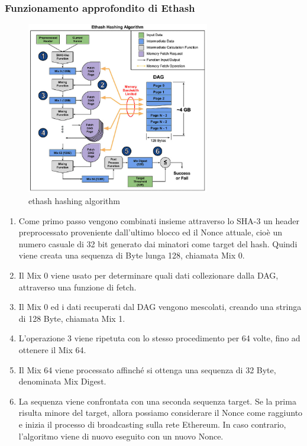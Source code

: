 \documentclass[a4paper,11pt]{report}
\begin{document}
\subsubsection{Funzionamento approfondito di Ethash}
\begin{figure}[htbp] 
\begin{center}
\includegraphics[width=8cm]{img/ethash.jpg}
\end{center}
\caption{ethash hashing algorithm}
\end{figure}
\begin{enumerate}
\item Come primo passo vengono combinati insieme attraverso lo SHA-3 un header preprocessato proveniente dall'ultimo blocco ed il Nonce attuale, cioè un numero casuale di 32 bit generato dai minatori come target del hash. Quindi viene creata una sequenza di Byte lunga 128, chiamata Mix 0.
\item Il Mix 0 viene usato per determinare quali dati collezionare dalla DAG, attraverso una funzione di fetch.
\item Il Mix 0 ed i dati recuperati dal DAG vengono mescolati, creando una stringa di 128 Byte, chiamata Mix 1.
\item  L'operazione 3 viene ripetuta con lo stesso procedimento per 64 volte, fino ad ottenere il Mix 64.
\item Il Mix 64 viene processato affinché si ottenga una sequenza di 32 Byte, denominata Mix Digest.
\item La sequenza viene confrontata con una seconda sequenza target. Se la prima risulta minore del target, allora possiamo considerare il Nonce come raggiunto e inizia il processo di broadcasting sulla rete Ethereum. In caso contrario, l'algoritmo viene di nuovo eseguito con un nuovo Nonce.
\end{enumerate}
\end{document}
